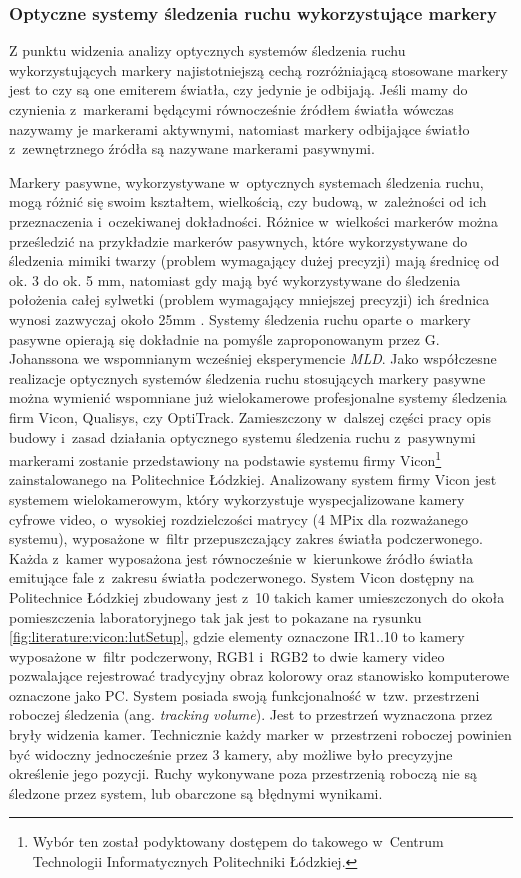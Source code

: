 \subsubsection*{Optyczne systemy śledzenia ruchu wykorzystujące markery}
Z punktu widzenia analizy optycznych systemów śledzenia ruchu wykorzystujących markery najistotniejszą cechą rozróżniającą stosowane markery jest to czy są one emiterem światła, czy jedynie je odbijają. Jeśli mamy do czynienia z~markerami będącymi równocześnie źródłem światła wówczas nazywamy je markerami aktywnymi, natomiast markery odbijające światło z~zewnętrznego źródła są nazywane markerami pasywnymi.

Markery pasywne, wykorzystywane w~optycznych systemach śledzenia ruchu, mogą różnić się swoim kształtem, wielkością, czy budową, w~zależności od ich przeznaczenia i~oczekiwanej dokładności. Różnice w~wielkości markerów można prześledzić na przykładzie markerów pasywnych, które wykorzystywane do śledzenia mimiki twarzy (problem wymagający dużej precyzji) mają średnicę od ok. 3 do ok. 5 mm, natomiast gdy mają być wykorzystywane do śledzenia położenia całej sylwetki (problem wymagający mniejszej precyzji) ich średnica wynosi zazwyczaj około 25mm \cite{ViconMarkersSet}. Systemy śledzenia ruchu oparte o~markery pasywne opierają się dokładnie na pomyśle zaproponowanym przez G. Johanssona we wspomnianym wcześniej eksperymencie \textsl{MLD}. Jako współczesne realizacje optycznych systemów śledzenia ruchu stosujących markery pasywne można wymienić wspomniane już wielokamerowe profesjonalne systemy śledzenia firm Vicon, Qualisys, czy OptiTrack. 
Zamieszczony w~dalszej części pracy opis budowy i~zasad działania optycznego systemu śledzenia ruchu z~pasywnymi markerami zostanie przedstawiony na podstawie systemu firmy Vicon\footnote{Wybór ten został podyktowany dostępem do takowego w~Centrum Technologii Informatycznych Politechniki Łódzkiej.} zainstalowanego na Politechnice Łódzkiej. 
Analizowany system firmy Vicon jest systemem wielokamerowym, który wykorzystuje wyspecjalizowane kamery cyfrowe video, o~wysokiej rozdzielczości matrycy (4 MPix dla rozważanego systemu), wyposażone w~filtr przepuszczający zakres światła podczerwonego. Każda z~kamer wyposażona jest równocześnie w~kierunkowe źródło światła emitujące fale z~zakresu światła podczerwonego. System Vicon dostępny na Politechnice Łódzkiej zbudowany jest z~10 takich kamer umieszczonych do okoła pomieszczenia laboratoryjnego tak jak jest to pokazane na rysunku \ref{fig:literature:vicon:lutSetup}, gdzie elementy oznaczone IR1..10 to kamery wyposażone w~filtr podczerwony, RGB1 i~RGB2 to dwie kamery video pozwalające rejestrować tradycyjny obraz kolorowy oraz stanowisko komputerowe oznaczone jako PC. System posiada swoją funkcjonalność w~tzw. przestrzeni roboczej śledzenia (ang. \textsl{tracking volume}). Jest to przestrzeń wyznaczona przez bryły widzenia kamer. Technicznie każdy marker w~przestrzeni roboczej powinien być widoczny jednocześnie przez 3 kamery, aby możliwe było precyzyjne określenie jego pozycji. Ruchy wykonywane poza przestrzenią roboczą nie są śledzone przez system, lub obarczone są błędnymi wynikami.

